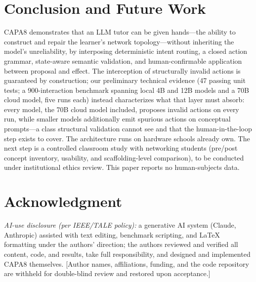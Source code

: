 \documentclass[conference,a4paper]{IEEEtran}
\newcommand{\bTotalCalls}{900} %
\begin{document}
\section{Conclusion and Future Work}
\label{sec:concl}
CAPA8 demonstrates that an LLM tutor can be given hands---the ability to construct and repair the learner's network topology---without inheriting the model's unreliability, by interposing deterministic intent routing, a closed action grammar, state-aware semantic validation, and human-confirmable application between proposal and effect. The interception of structurally invalid actions is guaranteed by construction; our preliminary technical evidence (47 passing unit tests; a \bTotalCalls-interaction benchmark spanning local 4B and 12B models and a 70B cloud model, five runs each) instead characterizes what that layer must absorb: every model, the 70B cloud model included, proposes invalid actions on every run, while smaller models additionally emit spurious actions on conceptual prompts---a class structural validation cannot see and that the human-in-the-loop step exists to cover. The architecture runs on hardware schools already own. The next step is a controlled classroom study with networking students (pre/post concept inventory, usability, and scaffolding-level comparison), to be conducted under institutional ethics review. This paper reports no human-subjects data.

\section*{Acknowledgment}
\textit{AI-use disclosure (per IEEE/TALE policy):} a generative AI system (Claude, Anthropic) assisted with text editing, benchmark scripting, and LaTeX formatting under the authors' direction; the authors reviewed and verified all content, code, and results, take full responsibility, and designed and implemented CAPA8 themselves. [Author names, affiliations, funding, and the code repository are withheld for double-blind review and restored upon acceptance.]
\end{document}
